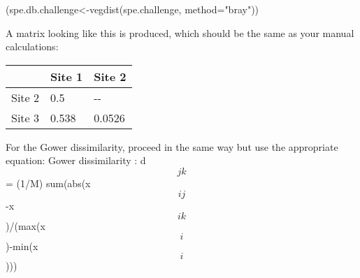 \documentclass[
]{book}
\newenvironment{Shaded}{\begin{snugshade}}{\end{snugshade}}
\newcommand{\AttributeTok}[1]{\textcolor[rgb]{0.77,0.63,0.00}{#1}}
\newcommand{\FunctionTok}[1]{\textcolor[rgb]{0.00,0.00,0.00}{#1}}
\newcommand{\NormalTok}[1]{#1}
\newcommand{\OtherTok}[1]{\textcolor[rgb]{0.56,0.35,0.01}{#1}}
\newcommand{\StringTok}[1]{\textcolor[rgb]{0.31,0.60,0.02}{#1}}
\begin{document}
\begin{Shaded}
\begin{Highlighting}[]
\NormalTok{(spe.db.challenge}\OtherTok{\textless{}{-}}\FunctionTok{vegdist}\NormalTok{(spe.challenge, }\AttributeTok{method=}\StringTok{"bray"}\NormalTok{))}
\end{Highlighting}
\end{Shaded}

A matrix looking like this is produced, which should be the same as your
manual calculations:

\begin{longtable}[]{@{}lll@{}}
\toprule
& Site 1 & Site 2\tabularnewline
\midrule
\endhead
Site 2 & 0.5 & -\/-\tabularnewline
Site 3 & 0.538 & 0.0526\tabularnewline
\bottomrule
\end{longtable}

For the Gower dissimilarity, proceed in the same way but use the
appropriate equation: Gower dissimilarity : d\[jk\] = (1/M)
sum(abs(x\[ij\]-x\[ik\])/(max(x\[i\])-min(x\[i\])))
\end{document}
